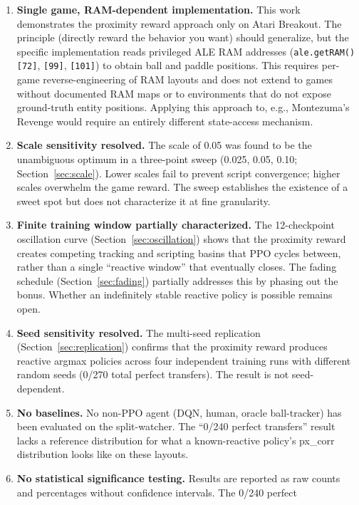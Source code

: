 \documentclass[11pt]{article}
\begin{document}
\begin{enumerate}
    \item \textbf{Single game, RAM-dependent implementation.} This work
    demonstrates the proximity reward approach only on Atari Breakout. The
    principle (directly reward the behavior you want) should generalize, but
    the specific implementation reads privileged ALE RAM addresses
    (\texttt{ale.getRAM()[72]}, \texttt{[99]}, \texttt{[101]}) to obtain
    ball and paddle positions. This requires per-game reverse-engineering
    of RAM layouts and does not extend to games without documented RAM maps
    or to environments that do not expose ground-truth entity positions.
    Applying this approach to, e.g., Montezuma's Revenge would require an
    entirely different state-access mechanism.
    \item \textbf{Scale sensitivity resolved.} The scale of 0.05 was found to
    be the unambiguous optimum in a three-point sweep (0.025, 0.05, 0.10;
    Section~\ref{sec:scale}). Lower scales fail to prevent script convergence;
    higher scales overwhelm the game reward. The sweep establishes the
    existence of a sweet spot but does not characterize it at fine granularity.
    \item \textbf{Finite training window partially characterized.} The
    12-checkpoint oscillation curve (Section~\ref{sec:oscillation}) shows that
    the proximity reward creates competing tracking and scripting basins that
    PPO cycles between, rather than a single ``reactive window'' that
    eventually closes. The fading schedule (Section~\ref{sec:fading})
    partially addresses this by phasing out the bonus. Whether an
    indefinitely stable reactive policy is possible remains open.
    \item \textbf{Seed sensitivity resolved.} The multi-seed replication
    (Section~\ref{sec:replication}) confirms that the proximity reward produces
    reactive argmax policies across four independent training runs with
    different random seeds (0/270 total perfect transfers). The result is not
    seed-dependent.
    \item \textbf{No baselines.} No non-PPO agent (DQN, human, oracle
    ball-tracker) has been evaluated on the split-watcher. The ``0/240
    perfect transfers'' result lacks a reference distribution for what a
    known-reactive policy's px\_corr distribution looks like on these layouts.
    \item \textbf{No statistical significance testing.} Results are reported as
    raw counts and percentages without confidence intervals. The 0/240 perfect

\end{enumerate}
\end{document}
